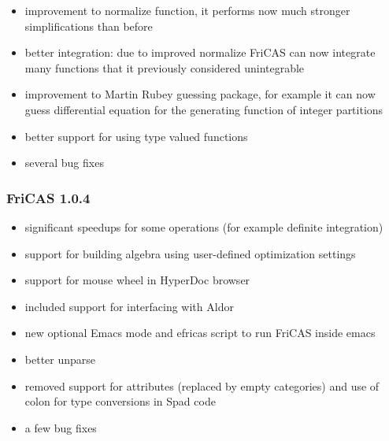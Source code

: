 \begin{itemize}
\item improvement to normalize function, it performs now much stronger
  simplifications than before

\item better integration: due to improved normalize FriCAS can now
  integrate many functions that it previously considered unintegrable

\item improvement to Martin Rubey guessing package, for example it can
  now guess differential equation for the generating function of
  integer partitions

\item better support for using type valued functions

\item several bug fixes
\end{itemize}

\subsubsection{FriCAS 1.0.4}

\begin{itemize}
\item significant speedups for some operations (for example definite
  integration)

\item support for building algebra using user-defined optimization
  settings

\item support for mouse wheel in HyperDoc browser

\item included support for interfacing with Aldor

\item new optional Emacs mode and efricas script to run FriCAS inside
  emacs

\item better unparse

\item removed support for attributes (replaced by empty categories)
  and use of colon for type conversions in Spad code

\item a few bug fixes
\end{itemize}


